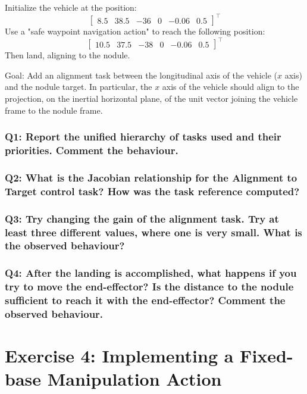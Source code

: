 \documentclass{article}
\begin{document}
Initialize the vehicle at the position:
\begin{displaymath}
\begin{bmatrix} 8.5 & 38.5 & -36 & 0 & -0.06 & 0.5 \end{bmatrix}^\top
\end{displaymath} 
Use a "safe waypoint navigation action" to reach the following position: 
\begin{displaymath}
\begin{bmatrix} 10.5 & 37.5 & -38 & 0 & -0.06 & 0.5 \end{bmatrix}^\top
\end{displaymath} 
Then land, aligning to the nodule.

Goal: Add an alignment task between the longitudinal axis of the vehicle ($x$ axis) and the nodule target. In particular, the $x$ axis of the vehicle should align to the projection, on the inertial horizontal plane, of the unit vector joining the vehicle frame to the nodule frame.

\subsubsection{Q1: Report the unified hierarchy of tasks used and their priorities. Comment the behaviour.}

\subsubsection{Q2: What is the Jacobian relationship for the Alignment to Target control task? How was the task reference computed?}

\subsubsection{Q3: Try changing the gain of the alignment task. Try at least three different values, where one is very small. What is the observed behaviour?}

\subsubsection{Q4: After the landing is accomplished, what happens if you try to move the end-effector? Is the distance to the nodule sufficient to reach it with the end-effector? Comment the observed behaviour.}


\clearpage
\section{Exercise 4: Implementing a Fixed-base Manipulation Action}
\end{document}
